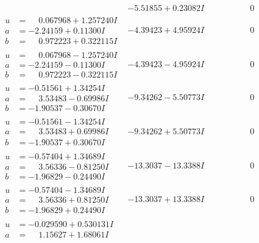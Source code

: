 \documentclass[1p]{elsarticle_modified}
\theoremstyle{definition}
\begin{document}
$$\begin{array}{c|c|c}
 & -5.51855 + 0.23082 I & \phantom{-0.000000 } 0 \\ \hline\begin{aligned}
u &= \phantom{-}0.067968 + 1.257240 I \\
a &= -2.24159 + 0.11300 I \\
b &= \phantom{-}0.972223 + 0.322115 I\end{aligned}
 & -4.39423 + 4.95924 I & \phantom{-0.000000 } 0 \\ \hline\begin{aligned}
u &= \phantom{-}0.067968 - 1.257240 I \\
a &= -2.24159 - 0.11300 I \\
b &= \phantom{-}0.972223 - 0.322115 I\end{aligned}
 & -4.39423 - 4.95924 I & \phantom{-0.000000 } 0 \\ \hline\begin{aligned}
u &= -0.51561 + 1.34254 I \\
a &= \phantom{-}3.53483 - 0.69986 I \\
b &= -1.90537 - 0.30670 I\end{aligned}
 & -9.34262 - 5.50773 I & \phantom{-0.000000 } 0 \\ \hline\begin{aligned}
u &= -0.51561 - 1.34254 I \\
a &= \phantom{-}3.53483 + 0.69986 I \\
b &= -1.90537 + 0.30670 I\end{aligned}
 & -9.34262 + 5.50773 I & \phantom{-0.000000 } 0 \\ \hline\begin{aligned}
u &= -0.57404 + 1.34689 I \\
a &= \phantom{-}3.56336 - 0.81250 I \\
b &= -1.96829 - 0.24490 I\end{aligned}
 & -13.3037 - 13.3388 I & \phantom{-0.000000 } 0 \\ \hline\begin{aligned}
u &= -0.57404 - 1.34689 I \\
a &= \phantom{-}3.56336 + 0.81250 I \\
b &= -1.96829 + 0.24490 I\end{aligned}
 & -13.3037 + 13.3388 I & \phantom{-0.000000 } 0 \\ \hline\begin{aligned}
u &= -0.029590 + 0.530131 I \\
a &= \phantom{-}1.15627 + 1.68061 I \\

\end{aligned}
\end{array}$$
\end{document}
